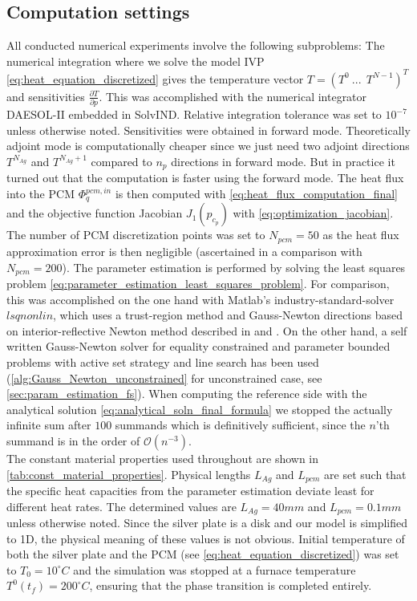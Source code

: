 \documentclass{scrartcl}[12pt, halfparskip]
\numberwithin{equation}{section}
\numberwithin{figure}{section}
\numberwithin{table}{section}
\begin{document}
\subsection{Computation settings}

All conducted numerical experiments involve the following subproblems: The numerical integration where we solve the model IVP \cref{eq:heat_equation_discretized} gives the temperature vector $T = (T^0 \ ... \ \ T^{N-1} )^T$ and sensitivities $\frac{\partial T}{\partial p}$. 
This was accomplished with the numerical integrator DAESOL-II embedded in SolvIND. Relative integration tolerance was set to $10^{-7}$ unless otherwise noted.
Sensitivities were obtained in forward mode. Theoretically adjoint mode is computationally cheaper since we just need two adjoint directions $T^{N_{Ag}}$ and $T^{N_{Ag}+1}$ compared to $n_p$ directions in forward mode. But in practice it turned out that the computation is faster using the forward mode.
The heat flux into the PCM $\varPhi_q^{pcm,in}$ is then computed with \cref{eq:heat_flux_computation_final} and the objective function Jacobian $J_1(p_{c_p})$ with \cref{eq:optimization_jacobian}. 
The number of PCM discretization points was set to $N_{pcm}=50$ as the heat flux approximation error is then negligible (ascertained in a comparison with $N_{pcm}=200$). 
The parameter estimation is performed by solving the least squares problem \cref{eq:parameter_estimation_least_squares_problem}. 
For comparison, this was accomplished on the one hand with Matlab's industry-standard-solver $lsqnonlin$, which uses a trust-region method and Gauss-Newton directions based on interior-reflective Newton method described in \cite{lsqnonlin_alg1} and \cite{lsqnonlin_alg2}. 
On the other hand, a self written Gauss-Newton solver for equality constrained and parameter bounded problems with active set strategy and line search has been used (\cref{alg:Gauss_Newton_unconstrained} for unconstrained case, see \cref{sec:param_estimation_fs}).
When computing the reference side with the analytical solution \cref{eq:analytical_soln_final_formula} we stopped the actually infinite sum after $100$ summands which is definitively sufficient, since the $n$'th summand is in the order of $\mathcal{O}(n^{-3})$. \\

The constant material properties used throughout are shown in \cref{tab:const_material_properties}.
Physical lengths $L_{Ag}$ and $L_{pcm}$ are set such that the specific heat capacities from the parameter estimation deviate least for different heat rates. The determined values are $L_{Ag}=40mm$ and $L_{pcm}=0.1mm$ unless otherwise noted. Since the silver plate is a disk and our model is simplified to 1D, the physical meaning of these values is not obvious.
Initial temperature of both the silver plate and the PCM (see \cref{eq:heat_equation_discretized}) was set to $T_0=10^\circ C$ and the simulation was stopped at a furnace temperature $T^0(t_f)=200^\circ C$, ensuring that the phase transition is completed entirely. \\
\end{document}
